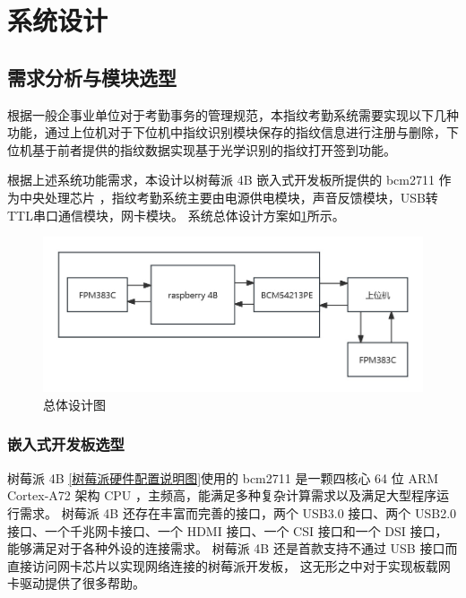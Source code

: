 \section{系统设计}

\subsection{需求分析与模块选型}

根据一般企事业单位对于考勤事务的管理规范，本指纹考勤系统需要实现以下几种功能，通过上位机对于下位机中指纹识别模块保存的指纹信息进行注册与删除，下位机基于前者提供的指纹数据实现基于光学识别的指纹打开签到功能。

根据上述系统功能需求，本设计以树莓派 4B 嵌入式开发板所提供的 bcm2711 作为中央处理芯片
，指纹考勤系统主要由电源供电模块，声音反馈模块，USB转TTL串口通信模块，网卡模块。
系统总体设计方案如\ref{总体设计图}所示。

\begin{figure}[ht]
    \centering
    \includegraphics[width=\textwidth]{imgs/总体设计图.png}
    \caption{总体设计图}    \label{总体设计图}
\end{figure}

\subsubsection{嵌入式开发板选型}

树莓派 4B \ref{树莓派硬件配置说明图}使用的 bcm2711 是一颗四核心 64 位 ARM Cortex-A72 架构 CPU ，主频高，能满足多种复杂计算需求以及满足大型程序运行需求。
树莓派 4B 还存在丰富而完善的接口，两个 USB3.0 接口、两个 USB2.0 接口、一个千兆网卡接口、一个 HDMI 接口、一个 CSI 接口和一个 DSI 接口，能够满足对于各种外设的连接需求。
树莓派 4B 还是首款支持不通过 USB 接口而直接访问网卡芯片以实现网络连接的树莓派开发板，
这无形之中对于实现板载网卡驱动提供了很多帮助。

